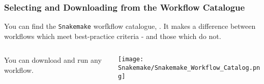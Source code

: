 \begin{frame}
 \frametitle{Selecting and Downloading from the Workflow Catalogue}
 You can find the \texttt{Snakemake} worfkflow catalogue, . It makes a difference between workflows which meet best-practice criteria - and those which do not.
 \begin{columns}
   \begin{column}{0.5\textwidth}
     You can download and run any workflow. \pause
   \end{column}
   \begin{column}{0.5\textwidth}
     \texttt{[image: Snakemake/Snakemake\_Workflow\_Catalog.png]}
   \end{column}
 \end{columns}

\end{frame}
